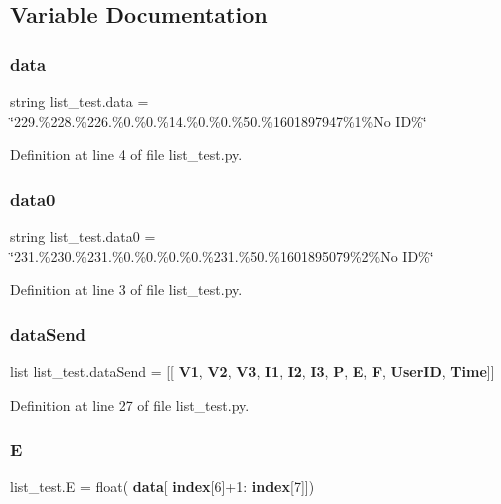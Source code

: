\subsection{Variable Documentation}
\mbox{\label{namespacelist__test_aae1a0409aac2602826f8829305ceb212}} 
\subsubsection{data}
{\footnotesize\ttfamily string list\+\_\+test.\+data = \char`\"{}229.\%228.\%226.\%0.\%0.\%14.\%0.\%0.\%50.\%1601897947\%1\%No ID\%\char`\"{}}



Definition at line 4 of file list\+\_\+test.\+py.

\mbox{\label{namespacelist__test_a8a0c37b20a59ebde7846b3a86aea944c}} 
\subsubsection{data0}
{\footnotesize\ttfamily string list\+\_\+test.\+data0 = \char`\"{}231.\%230.\%231.\%0.\%0.\%0.\%0.\%231.\%50.\%1601895079\%2\%No ID\%\char`\"{}}



Definition at line 3 of file list\+\_\+test.\+py.

\mbox{\label{namespacelist__test_a14d6b1b157c59484fab55ec154e62acf}} 
\subsubsection{data\+Send}
{\footnotesize\ttfamily list list\+\_\+test.\+data\+Send = [[\textbf{ V1}, \textbf{ V2}, \textbf{ V3}, \textbf{ I1}, \textbf{ I2}, \textbf{ I3}, \textbf{ P}, \textbf{ E}, \textbf{ F}, \textbf{ User\+ID}, \textbf{ Time}]]}



Definition at line 27 of file list\+\_\+test.\+py.

\mbox{\label{namespacelist__test_abe49bc0eda94117c05e465afbac0f098}} 
\subsubsection{E}
{\footnotesize\ttfamily list\+\_\+test.\+E = float(\textbf{ data}[\textbf{ index}[6]+1\+:\textbf{ index}[7]])}



